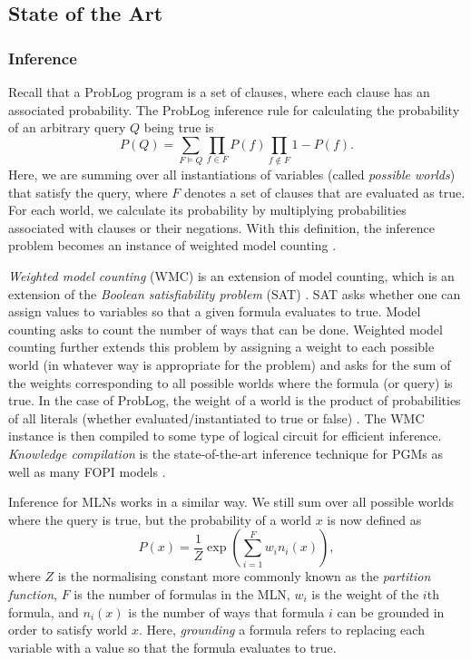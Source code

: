 \documentclass[11pt,english,twocolumn]{article}
\begin{document}
\subsection*{State of the Art} %

\subsubsection*{Inference}

Recall that a ProbLog program is a set of clauses, where each clause has an
associated probability. The ProbLog inference rule
\cite{DBLP:series/synthesis/2016Raedt,DBLP:conf/iclp/Sato95} for calculating the
probability of an arbitrary query $Q$ being true is
\[
  P(Q) = \sum_{F \models Q} \prod_{f \in F} P(f) \prod_{f \not\in F} 1 -
  P(f).
\]
Here, we are summing over all instantiations of variables (called \emph{possible
worlds}) that satisfy the query, where $F$ denotes a set of clauses that are
evaluated as true. For each world, we calculate its probability by multiplying
probabilities associated with clauses or their negations. With this
definition, the inference problem becomes an instance of weighted model
counting \cite{DBLP:series/synthesis/2016Raedt}.

\emph{Weighted model counting} (WMC) is an extension of model counting, which is
an extension of the \emph{Boolean satisfiability problem} (SAT)
\cite{DBLP:journals/ai/ChaviraD08}. SAT asks whether one can assign values to
variables so that a given formula evaluates to true. Model counting asks to
count the number of ways that can be done. Weighted model counting further
extends this problem by assigning a weight to each possible world (in whatever
way is appropriate for the problem) and asks for the sum of the weights
corresponding to all possible worlds where the formula (or query) is true. In
the case of ProbLog, the weight of a world is the product of probabilities of
all literals (whether evaluated/instantiated to true or false)
\cite{DBLP:series/synthesis/2016Raedt}. The WMC instance is then compiled to
some type of logical circuit for efficient inference. \emph{Knowledge
  compilation} \cite{DBLP:conf/ijcai/BroeckTMDR11} is the state-of-the-art
inference technique for PGMs as well as many FOPI models
\cite{DBLP:series/synthesis/2016Raedt}.

Inference for MLNs works in a similar way. We still sum over all possible
worlds where the query is true, but the probability of a world $x$ is now
defined as
\[
  P(x) = \frac{1}{Z} \exp \left( \sum_{i=1}^F w_i n_i(x) \right),
\]
where $Z$ is the normalising constant more commonly known as the \emph{partition
function}, $F$ is the number of formulas in the MLN, $w_i$ is the weight of the
$i$th formula, and $n_i(x)$ is the number of ways that formula $i$ can be
grounded in order to satisfy world $x$. Here, \emph{grounding} a formula refers
to replacing each variable with a value so that the formula evaluates to true.
\end{document}
